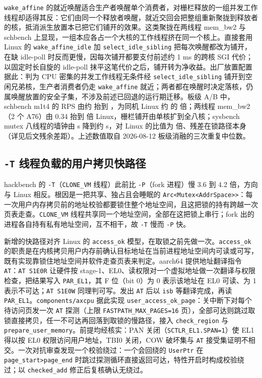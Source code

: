 \texttt{wake\_affine} 的就近唤醒适合生产者唤醒单个消费者，对栅栏释放的一组并发工作线程却适得其反：它们由同一个释放者唤醒，就近交回会把整组重新聚拢到释放者的核，抵消派生放置本已把它们铺开的效果。这类聚拢在两线程 mem\_bw2 与 schbench 上显现，一组本应各占一个大核的工作线程挤在同一个核上。直接套用 Linux 的 \texttt{wake\_affine\_idle} 加 \texttt{select\_idle\_sibling} 把每次唤醒都改为铺开，在缺 idle-poll 时反而更慢，因每次铺开都要支付前述约 1 ms 的跨核 SGI 代价；以固定时长自旋的 idle-poll 抹平这笔代价之后，铺开转为净收益。出厂放置配置据此：判为 CPU 密集的并发工作线程无条件经 \texttt{select\_idle\_sibling} 铺开到空闲兄弟核，生产者消费者仍走 \texttt{wake\_affine} 就近；两者都在唤醒时决定落核，仍属唤醒放置的安全子集，不涉及前述已回退的运行期迁移。板级 A/B 中，schbench m1t4 的 RPS 由约 \nSchRpsBefore{} 抬到 \nSchRps{}，为同机 Linux 约 \nSchRpsLin{} 的 \nSchRpsRatio{} 倍；两线程 mem\_bw2（2 个 A76）由 0.34 抬到 \nMemBwTwo{} 倍 Linux，栅栏铺开由单核扩到全八核；sysbench mutex 八线程的墙钟由 \nMutexBefore{} s 降到约 \nMutexAfter{} s，对 Linux 的比值为 \nMutexRatio{} 倍、残差在锁路径本身（详见后文残余差距）。上述数值取自 2026-08-12 板级消融的三次重复中位数。

\subsection{\texttt{-T} 线程负载的用户拷贝快路径}

hackbench 的 \texttt{-T}（\texttt{CLONE\_VM} 线程）此前比 \texttt{-P}（fork 进程）慢 3.6 到 4.2 倍，方向与 Linux 相反。根因是一把共享、独占且会睡眠的 \texttt{Arc<Mutex<AddrSpace>>}：每一次用户内存拷贝前的地址校验都要锁住整个地址空间，且这把锁的持有跨越一次页表走查。\texttt{CLONE\_VM} 线程共享同一个地址空间，全部在这把锁上串行；fork 出的进程各自持有私有地址空间，互不相干，故 \texttt{-T} 慢而 \texttt{-P} 快。

新增的快路径对齐 Linux 的 \texttt{access\_ok} 模型，在取锁之前先做一次。\texttt{access\_ok} 的职责是在内核拷贝用户内存前确认目标地址在当前进程地址空间内可读或可写，既有实现靠锁住地址空间并软件走查页表来判定。aarch64 提供地址翻译指令 \texttt{AT}：\texttt{AT S1E0R} 让硬件按 stage-1、EL0、读权限对一个虚拟地址做一次翻译与权限检查，把结果写入 \texttt{PAR\_EL1}，其 F 位（bit 0）为 0 表示该地址在 EL0 可读、为 1 表示不可达；\texttt{AT S1E0W} 同理判可写。发出 \texttt{AT} 后以 \texttt{isb} 等翻译完成，再读 \texttt{PAR\_EL1}。\texttt{components/axcpu} 据此实现 \texttt{user\_access\_ok\_page}：关中断下对每个待访问页发一次 \texttt{AT} 探测（上限 \texttt{FASTPATH\_MAX\_PAGES=16} 页），全部可达则跳过取锁直接拷贝，任一不可达再回落到取锁的慢路径，接入 \texttt{check\_region} 与 \texttt{prepare\_user\_memory}。前提均经核实：PAN 关闭（\texttt{SCTLR\_EL1.SPAN=1}）使 EL1 得以按 EL0 权限访问用户地址，TBI0 关闭，COW 破坏集与 \texttt{AT} 接受集证明不相交。一次对抗审查发现一个校验绕过：一个会回绕的 \texttt{UserPtr} 在 \texttt{page\_start>page\_end} 时跳过探测循环直接返回可达，特性开启时构成校验绕过；以 \texttt{checked\_add} 修正后复核确认无绕过。

